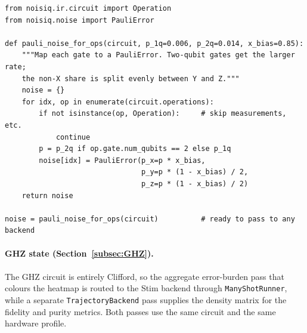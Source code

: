 \documentclass[10pt,twocolumn]{article}
\begin{document}
\begin{lstlisting}[style=noisiqpython, caption={A hand-built Pauli noise model.
The model is a dict from operation index to a channel; here a larger error rate
is assigned to two-qubit gates than to single-qubit gates, with an X bias.},
label={lst:noise_manual}]
from noisiq.ir.circuit import Operation
from noisiq.noise import PauliError
 
def pauli_noise_for_ops(circuit, p_1q=0.006, p_2q=0.014, x_bias=0.85):
    """Map each gate to a PauliError. Two-qubit gates get the larger rate;
    the non-X share is split evenly between Y and Z."""
    noise = {}
    for idx, op in enumerate(circuit.operations):
        if not isinstance(op, Operation):     # skip measurements, etc.
            continue
        p = p_2q if op.gate.num_qubits == 2 else p_1q
        noise[idx] = PauliError(p_x=p * x_bias,
                                p_y=p * (1 - x_bias) / 2,
                                p_z=p * (1 - x_bias) / 2)
    return noise
 
noise = pauli_noise_for_ops(circuit)          # ready to pass to any backend
\end{lstlisting}
 
\paragraph{GHZ state (Section~\ref{subsec:GHZ}).}
The GHZ circuit is entirely Clifford, so the aggregate error-burden pass that
colours the heatmap is routed to the Stim backend through
\texttt{ManyShotRunner}, while a separate \texttt{TrajectoryBackend} pass
supplies the density matrix for the fidelity and purity metrics. Both passes
use the same circuit and the same hardware profile.
 
\end{document}
